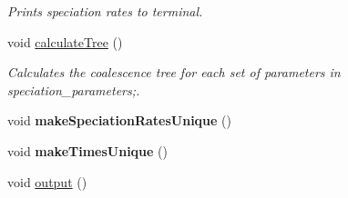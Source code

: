 \begin{DoxyCompactItemize}
\begin{DoxyCompactList}\small\item\em Prints speciation rates to terminal. \end{DoxyCompactList}\item 
void \hyperlink{class_community_adfa9a1c84bb326092805614ad195fcdd}{calculate\+Tree} ()\hypertarget{class_community_adfa9a1c84bb326092805614ad195fcdd}{}\label{class_community_adfa9a1c84bb326092805614ad195fcdd}

\begin{DoxyCompactList}\small\item\em Calculates the coalescence tree for each set of parameters in speciation\+\_\+parameters;. \end{DoxyCompactList}\item 
void {\bfseries make\+Speciation\+Rates\+Unique} ()\hypertarget{class_community_a52eff805c7e71e335662fb75f551ce00}{}\label{class_community_a52eff805c7e71e335662fb75f551ce00}

\item 
void {\bfseries make\+Times\+Unique} ()\hypertarget{class_community_a766763e9146f175ecdc62eecbd53ff60}{}\label{class_community_a766763e9146f175ecdc62eecbd53ff60}

\item 
void \hyperlink{class_community_ad2483623c7ad7a11564fc49305204585}{output} ()\hypertarget{class_community_ad2483623c7ad7a11564fc49305204585}{}\label{class_community_ad2483623c7ad7a11564fc49305204585}


\end{DoxyCompactItemize}
